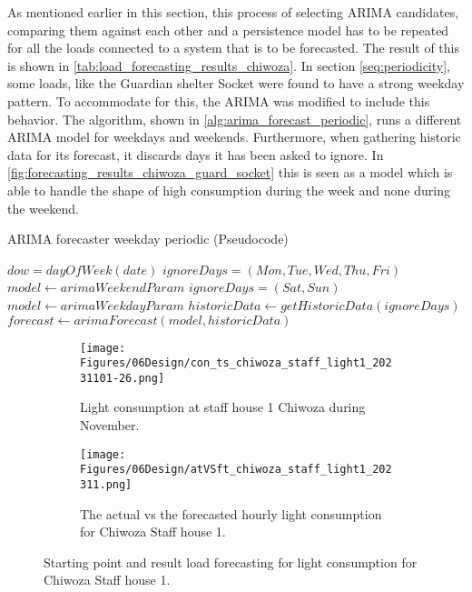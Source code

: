 As mentioned earlier in this section, this process of selecting ARIMA candidates, comparing them against each other and a persistence model has to be repeated for all the loads connected to a system that is to be forecasted. The result of this is shown in \ref{tab:load_forecasting_results_chiwoza}. In section \ref{seq:periodicity}, some loads, like the Guardian shelter Socket were found to have a strong weekday pattern. To accommodate for this, the ARIMA was modified to include this behavior. The algorithm, shown in \ref{alg:arima_forecast_periodic}, runs a different ARIMA model for weekdays and weekends. Furthermore, when gathering historic data for its forecast, it discards days it has been asked to ignore. In \ref{fig:forecasting_results_chiwoza_guard_socket} this is seen as a model which is able to handle the shape of high consumption during the week and none during the weekend.

\begin{algorithm}
\caption{ARIMA forecaster weekday periodic (Pseudocode)}\label{alg:arima_forecast_periodic}
\begin{algorithmic}
    \State$dow = dayOfWeek(date) $
        \State$ignoreDays = (Mon,Tue,Wed,Thu,Fri)$
        \State$model \gets arimaWeekendParam$
    \Else
        \State$ignoreDays = (Sat,Sun)$
        \State$model \gets arimaWeekdayParam$
    \EndIf
    \State$historicData \gets getHistoricData(ignoreDays)$
    \State$forecast \gets arimaForecast(model, historicData)$
\end{algorithmic}
\end{algorithm}

\begin{figure}
    \begin{subfigure}{\textwidth}
    \centering
    \texttt{[image: Figures/06Design/con\_ts\_chiwoza\_staff\_light1\_20231101-26.png]}
    \caption{Light consumption at staff house 1 Chiwoza during November.}
    \label{fig:con_ts_chiwoza_staff_light1_20231101-26}
  \end{subfigure}

  \vspace{0.5cm}

  \begin{subfigure}{\textwidth}
    \centering
    \texttt{[image: Figures/06Design/atVSft\_chiwoza\_staff\_light1\_202311.png]}
    \caption{The actual vs the forecasted hourly light consumption for Chiwoza Staff house 1.}
    \label{fig:atVSft_chiwoza_staff_light1_202311}
  \end{subfigure}

  \caption[Light consumption staff house 1 forecasting]{Starting point and result load forecasting for light consumption for Chiwoza Staff house 1.}
  \label{fig:forecasting_results_chiwoza_staff_light1}
\end{figure}

